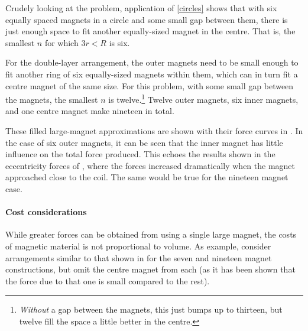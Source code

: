 Crudely looking at the problem, application of \eqref{circles} shows
that with six equally spaced magnets in a circle and some small gap
between them, there is just enough space to fit another equally-sized
magnet in the centre. That is, the smallest $n$ for which $3r<R$ is six.

For the double-layer arrangement, the outer magnets need to be small
enough to fit another ring of six equally-sized magnets within them,
which can in turn fit a centre magnet of the same size. For this
problem, with some small gap between the magnets, the smallest $n$ is
twelve.\footnote{\emph{Without} a gap between the magnets, this just
  bumps up to thirteen, but twelve fill the space a little better in
  the centre.} Twelve outer magnets, six inner magnets, and one centre
magnet make nineteen in total.

These filled large-magnet approximations are shown with their force
curves in . In the case of six outer magnets, it
can be seen that the inner magnet has little influence on the total
force produced. This echoes the results shown in the eccentricity
forces of , where the forces increased dramatically
when the magnet approached close to the coil. The same would be true
for the nineteen magnet case.

\begin{figure}
  \begin{subfigure}
  \end{subfigure}\par
  \begin{subfigure}
  \end{subfigure}
\end{figure}

\paragraph{Cost considerations} 

While greater forces can be obtained from using a single large magnet,
the costs of magnetic material is not proportional to volume. As
example, consider arrangements similar to that shown in
 for the seven and nineteen magnet constructions,
but omit the centre magnet from each (as it has been shown that the
force due to that one is small compared to the rest).

